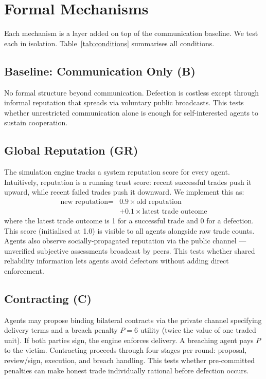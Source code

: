\documentclass{article}
\begin{document}
\section{Formal Mechanisms}
\label{sec:mechanisms}

Each mechanism is a layer added on top of the communication baseline. We test each in isolation. Table~\ref{tab:conditions} summarises all conditions.

\subsection{Baseline: Communication Only (B)}

No formal structure beyond communication. Defection is costless except through informal reputation that spreads via voluntary public broadcasts. This tests whether unrestricted communication alone is enough for self-interested agents to sustain cooperation.

\subsection{Global Reputation (GR)}

The simulation engine tracks a system reputation score for every agent. Intuitively, reputation is a running trust score: recent successful trades push it upward, while recent failed trades push it downward. We implement this as:
\[
\begin{aligned}
\text{new reputation} ={}& 0.9 \times \text{old reputation} \\
&+ 0.1 \times \text{latest trade outcome}
\end{aligned}
\]
where the latest trade outcome is 1 for a successful trade and 0 for a defection. This score (initialised at 1.0) is visible to all agents alongside raw trade counts. Agents also observe socially-propagated reputation via the public channel --- unverified subjective assessments broadcast by peers. This tests whether shared reliability information lets agents avoid defectors without adding direct enforcement.

\subsection{Contracting (C)}

Agents may propose binding bilateral contracts via the private channel specifying delivery terms and a breach penalty $P = 6$ utility (twice the value of one traded unit). If both parties sign, the engine enforces delivery. A breaching agent pays $P$ to the victim. Contracting proceeds through four stages per round: proposal, review/sign, execution, and breach handling. This tests whether pre-committed penalties can make honest trade individually rational before defection occurs.
\end{document}
